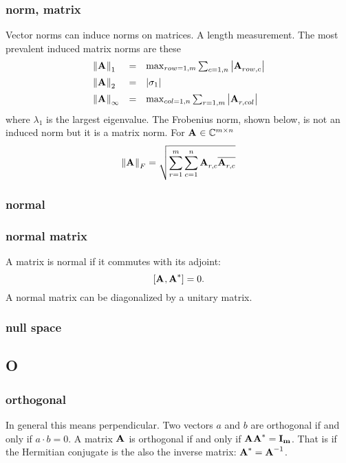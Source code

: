 \subsubsection*{norm, matrix}
Vector norms can induce norms on matrices. A length measurement.
The most prevalent induced matrix norms are these
\begin{equation}
\begin{array}{ lcl }
    \left\lVert\textbf{A}^{\mathrm{}}\right\rVert_{1}   &=& \max_{row=1,m}\sum_{c=1,n}{\left|\textbf{A}^{\mathrm{}}_{row,c}\right|} \\[5pt]
    \left\lVert\textbf{A}^{\mathrm{}}\right\rVert_{2}   &=& \left|\sigma_{1}\right| \\[5pt]
    \left\lVert\textbf{A}^{\mathrm{}}\right\rVert_\infty &=& \max_{col=1,n}\sum_{r=1,m}{\left|\textbf{A}^{\mathrm{}}_{r,col}\right|} \\
\end{array}
\end{equation}
where $\lambda_{1}$ is the largest eigenvalue.
The Frobenius norm, shown below, is not an induced norm but it is a matrix norm. For $\textbf{A}^{\mathrm{}}\in\mathbb{C}^{m \times n}$
\begin{equation}
  \left\lVert\textbf{A}^{\mathrm{}}\right\rVert_F = \sqrt{\sum_{r=1}^{m}{\sum_{c=1}^{n}{\textbf{A}^{\mathrm{}}_{r,c}\overline{\textbf{A}^{\mathrm{}}_{r,c}}}}}
\end{equation}

\subsubsection*{normal}

\subsubsection*{normal matrix}
A matrix is normal if it commutes with its adjoint:
\begin{equation}
  \left[  \textbf{A}^{\mathrm{}}, \textbf{A}^{\mathrm{*}}  \right] = 0.
\end{equation}
A normal matrix can be diagonalized by a unitary matrix.

\subsubsection*{null space}

\subsection*{O} 

\subsubsection*{orthogonal}
In general this means perpendicular. Two vectors $a$ and $b$ are orthogonal if and only if $a\cdot b=0$. A matrix $\textbf{A}^{\mathrm{}}$ is orthogonal if and only if $\textbf{A}^{\mathrm{}}\textbf{A}^{\mathrm{*}} = \bf{I}_m $. That is if the Hermitian conjugate is the also the inverse matrix: $\textbf{A}^{\mathrm{*}}=\textbf{A}^{\mathrm{-1}}$.

